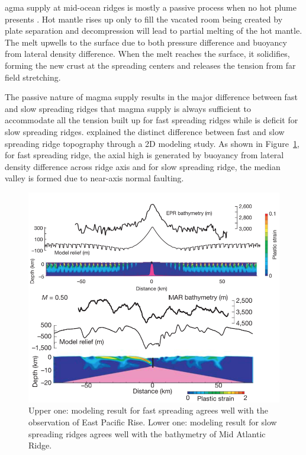 \documentclass[12pt]{article}
\begin{document}
agma supply at mid-ocean ridges is mostly a passive process when no hot plume presents \citep{Fowler2004}. Hot mantle rises up only to fill the vacated room being created by plate separation and decompression will lead to partial melting of the hot mantle. The melt upwells to the surface due to both pressure difference and buoyancy from lateral density difference. When the melt reaches the surface, it solidifies, forming the new crust at the spreading centers and releases the tension from far field stretching. 

The passive nature of magma supply results in the major difference between fast and slow spreading ridges that magma supply is always sufficient to accommodate all the tension built up for fast spreading ridges while is deficit for slow spreading ridges. \citep{Buck2005} explained the distinct difference between fast and slow spreading ridge topography through a 2D modeling study. As shown in Figure~\ref{fig5_1}, for fast spreading ridge, the axial high is generated by buoyancy from lateral density difference across ridge axis and for slow spreading ridge, the median valley is formed due to near-axis normal faulting.
\begin{figure}[H]
 \centering
  \includegraphics[scale=0.7]{fig5_1.png}
 \caption{\small{Upper one: modeling result for fast spreading agrees well with the observation of East Pacific Rise. Lower one: modeling result for slow spreading ridges agrees well with the bathymetry of Mid Atlantic Ridge. \citep{Buck2005}}}
 \label{fig5_1}
\end{figure}
\end{document}
